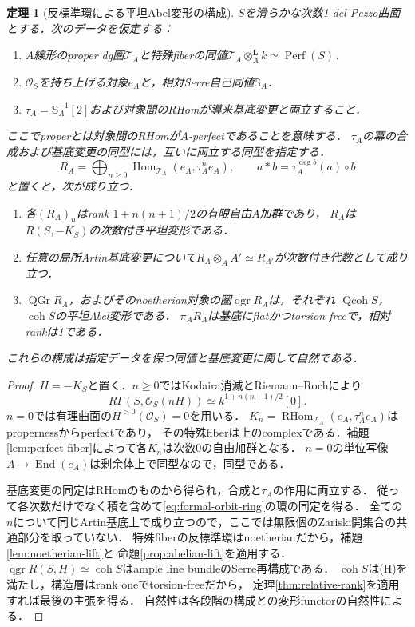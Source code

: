 \documentclass[11pt,a4paper]{ltjsarticle}
\newtheorem{theorem}{定理}[section]
\theoremstyle{definition}
\newcommand{\OO}{\mathcal O}
\newcommand{\TT}{\mathcal T}
\newcommand{\Hom}{\operatorname{Hom}}
\newcommand{\RHom}{\operatorname{RHom}}
\newcommand{\End}{\operatorname{End}}
\newcommand{\qgr}{\operatorname{qgr}}
\newcommand{\QGr}{\operatorname{QGr}}
\newcommand{\coh}{\operatorname{coh}}
\newcommand{\Perf}{\operatorname{Perf}}
\newcommand{\SSer}{\mathbb S}
\begin{document}
\begin{theorem}[反標準環による平坦Abel変形の構成]\label{thm:abelian-envelope}
$S$を滑らかな次数1 del Pezzo曲面とする．次のデータを仮定する：
\begin{enumerate}
\item $A$線形のproper dg圏$\TT_A$と特殊fiberの同値$\TT_A\otimes_A^{\mathbf L}k\simeq\Perf(S)$．
\item $\OO_S$を持ち上げる対象$e_A$と，相対Serre自己同値$\SSer_A$．
\item $\tau_A=\SSer_A^{-1}[2]$および対象間のRHomが導来基底変更と両立すること．
\end{enumerate}
ここでproperとは対象間のRHomが$A$-perfectであることを意味する．
$\tau_A$の冪の合成および基底変更の同型には，互いに両立する同型を指定する．
\begin{equation}\label{eq:formal-orbit-ring}
 R_A=\bigoplus_{n\geq0}\Hom_{\TT_A}(e_A,\tau_A^ne_A),\qquad
 a*b=\tau_A^{\deg b}(a)\circ b
\end{equation}
と置くと，次が成り立つ．
\begin{enumerate}
\item 各$(R_A)_n$はrank $1+n(n+1)/2$の有限自由$A$加群であり，
  $R_A$は$R(S,-K_S)$の次数付き平坦変形である．
\item 任意の局所Artin基底変更について$R_A\otimes_AA'\simeq R_{A'}$が次数付き代数として成り立つ．
\item $\QGr R_A$，およびそのnoetherian対象の圏$\qgr R_A$は，それぞれ
  $\operatorname{Qcoh}S$，$\coh S$の平坦Abel変形である．
  $\pi_A R_A$は基底にflatかつtorsion-freeで，相対rankは1である．
\end{enumerate}
これらの構成は指定データを保つ同値と基底変更に関して自然である．
\end{theorem}
\begin{proof}
$H=-K_S$と置く．$n\geq0$ではKodaira消滅とRiemann--Rochにより
\[
 R\Gamma(S,\OO_S(nH))\simeq k^{1+n(n+1)/2}[0].
\]
$n=0$では有理曲面の$H^{>0}(\OO_S)=0$を用いる．
$K_n=\RHom_{\TT_A}(e_A,\tau_A^ne_A)$はpropernessからperfectであり，
その特殊fiberは上のcomplexである．補題\ref{lem:perfect-fiber}によって各$K_n$は次数0の自由加群となる．
$n=0$の単位写像$A\to\End(e_A)$は剰余体上で同型なので，同型である．

基底変更の同定はRHomのものから得られ，合成と$\tau_A$の作用に両立する．
従って各次数だけでなく積を含めて\eqref{eq:formal-orbit-ring}の環の同定を得る．
全ての$n$について同じArtin基底上で成り立つので，ここでは無限個のZariski開集合の共通部分を取っていない．
特殊fiberの反標準環はnoetherianだから，補題\ref{lem:noetherian-lift}と
命題\ref{prop:abelian-lift}を適用する．
$\qgr R(S,H)\simeq\coh S$はample line bundleのSerre再構成である．
$\coh S$は\textup{(H)}を満たし，構造層はrank oneでtorsion-freeだから，
定理\ref{thm:relative-rank}を適用すれば最後の主張を得る．
自然性は各段階の構成と\cite[\S4]{DDL}の変形functorの自然性による．
\end{proof}
\end{document}
